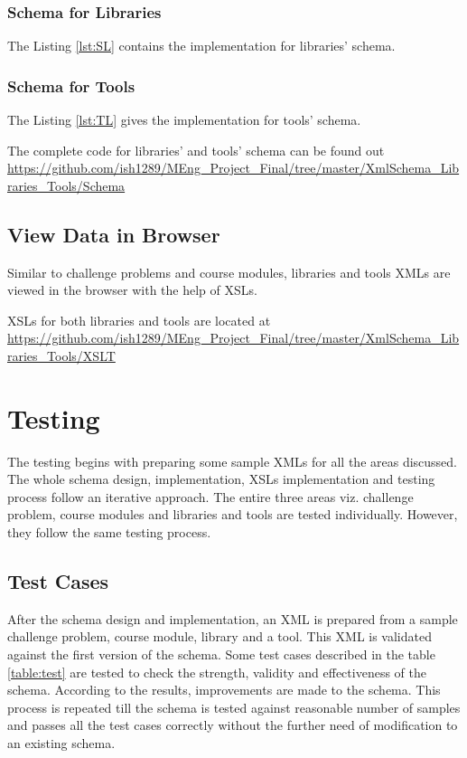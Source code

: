 \documentclass[11pt,letterpaper]{report}
\begin{document}
\subsection*{Schema for Libraries}
The Listing \ref{lst:SL} contains the implementation for libraries' schema. 

\subsection*{Schema for Tools}
The Listing \ref{lst:TL} gives the implementation for tools' schema. 


\bigskip
The complete code for libraries' and tools' schema can be found out \url{https://github.com/ish1289/MEng_Project_Final/tree/master/XmlSchema_Libraries_Tools/Schema}
\section*{View Data in Browser}
Similar to challenge problems and course modules, libraries and tools XMLs are viewed in the browser with the help of XSLs. 

XSLs for both libraries and tools are located at 
\url{https://github.com/ish1289/MEng_Project_Final/tree/master/XmlSchema_Libraries_Tools/XSLT}


\chapter{Testing}

The testing begins with preparing some sample XMLs for all the areas discussed. The whole schema design, implementation, XSLs implementation and testing process follow an iterative approach. The entire three areas viz. challenge problem, course modules and libraries and tools are tested individually. However, they follow the same testing process. 
 
\section*{Test Cases}
After the schema design and implementation, an XML is prepared from a sample challenge problem, course module, library and a tool. This XML is validated against the first version of the schema. Some test cases described in the table \ref{table:test} are tested to check the strength, validity and effectiveness of the schema. According to the results, improvements are made to the schema. This process is repeated till the schema is tested against reasonable number of samples and passes all the test cases correctly without the further need of modification to an existing schema. 
\end{document}
